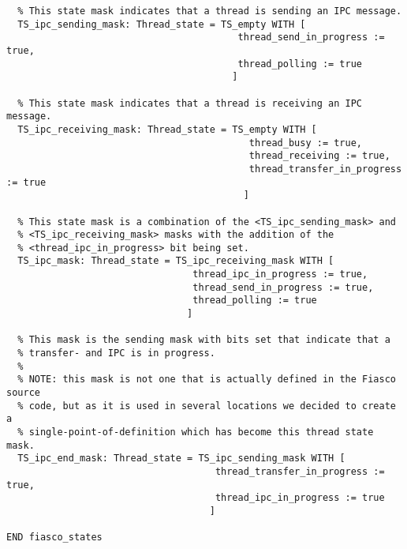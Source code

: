 \begin{lstlisting}
  % This state mask indicates that a thread is sending an IPC message.
  TS_ipc_sending_mask: Thread_state = TS_empty WITH [
                                         thread_send_in_progress := true,
                                         thread_polling := true
                                        ]

  % This state mask indicates that a thread is receiving an IPC message.
  TS_ipc_receiving_mask: Thread_state = TS_empty WITH [
                                           thread_busy := true,
                                           thread_receiving := true,
                                           thread_transfer_in_progress := true
                                          ]

  % This state mask is a combination of the <TS_ipc_sending_mask> and 
  % <TS_ipc_receiving_mask> masks with the addition of the 
  % <thread_ipc_in_progress> bit being set.
  TS_ipc_mask: Thread_state = TS_ipc_receiving_mask WITH [
                                 thread_ipc_in_progress := true,
                                 thread_send_in_progress := true,
                                 thread_polling := true
                                ]

  % This mask is the sending mask with bits set that indicate that a
  % transfer- and IPC is in progress.
  %
  % NOTE: this mask is not one that is actually defined in the Fiasco source
  % code, but as it is used in several locations we decided to create a 
  % single-point-of-definition which has become this thread state mask.
  TS_ipc_end_mask: Thread_state = TS_ipc_sending_mask WITH [
                                     thread_transfer_in_progress := true,
                                     thread_ipc_in_progress := true
                                    ]

END fiasco_states
\end{lstlisting}